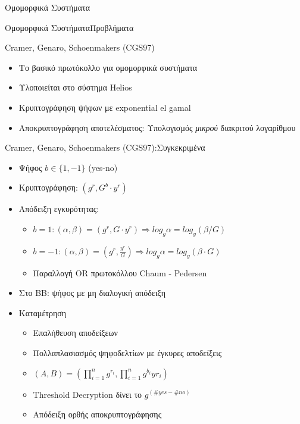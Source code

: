 \documentclass[handout]{beamer}
\begin{document}
\begin{section}{Ομομορφικά Συστήματα}
\begin{frame}{Ομομορφικά Συστήματα}{Προβλήματα}
\end{frame}

\begin{frame}{Cramer, Genaro, Schoenmakers (CGS97)}
    \begin{itemize}
        \item Το βασικό πρωτόκολλο για ομομορφικά συστήματα \pause 
        \item Υλοποιείται στο σύστημα Helios \pause 
        \item Κρυπτογράφηση ψήφων με exponential el gamal \pause 
        \item Αποκρυπτογράφηση αποτελέσματος: Υπολογισμός \pause  \emph{μικρού} διακριτού λογαρίθμου  \pause 
    \end{itemize}
\end{frame}

\begin{frame}{Cramer, Genaro, Schoenmakers (CGS97):Συγκεκριμένα}
    \begin{itemize}
        \item Ψήφος $b \in \{1,-1\}$ (yes-no) \pause 
        \item Κρυπτογράφηση: $(g^r, G^b \cdot y^r)$ \pause 
        \item Απόδειξη εγκυρότητας:
        \begin{itemize}
            \item $b=1: (\alpha,\beta) = (g^r, G \cdot y^r) \Rightarrow log_g \alpha = log_y (\beta / G)$
            \item $b=-1: (\alpha,\beta) = (g^r, \frac{y^r}{G} ) \Rightarrow log_g \alpha = log_y (\beta \cdot G)$
            \item Παραλλαγή OR πρωτοκόλλου Chaum - Pedersen 
        \end{itemize}
        \item Στο BB: ψήφος με μη διαλογική απόδειξη \pause 
        \item Καταμέτρηση \pause 
        \begin{itemize}
            \item Επαλήθευση αποδείξεων \pause 
            \item Πολλαπλασιασμός ψηφοδελτίων με έγκυρες αποδείξεις
            \item $(A,B) = (\prod_{i=1}^n g^{r_i}, \prod_{i=1}^n g^{b_i}y{r_i}) $ \pause 
            
            \item Threshold Decryption δίνει το $g^{(\#yes-\#no)}$
            \item Απόδειξη ορθής αποκρυπτογράφησης
        \end{itemize}
    \end{itemize}
\end{frame}



\end{section}
\end{document}
